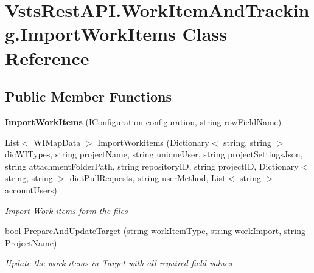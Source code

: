 \hypertarget{class_vsts_rest_a_p_i_1_1_work_item_and_tracking_1_1_import_work_items}{}\section{Vsts\+Rest\+A\+P\+I.\+Work\+Item\+And\+Tracking.\+Import\+Work\+Items Class Reference}
\label{class_vsts_rest_a_p_i_1_1_work_item_and_tracking_1_1_import_work_items}
\subsection*{Public Member Functions}
\begin{DoxyCompactItemize}
\item 
\mbox{\label{class_vsts_rest_a_p_i_1_1_work_item_and_tracking_1_1_import_work_items_a2ee1fe393b4ce2879cf0ad53feef7be2}} 
{\bfseries Import\+Work\+Items} (\mbox{\hyperlink{interface_vsts_rest_a_p_i_1_1_i_configuration}{I\+Configuration}} configuration, string row\+Field\+Name)
\item 
List$<$ \mbox{\hyperlink{class_vsts_rest_a_p_i_1_1_work_item_and_tracking_1_1_w_i_map_data}{W\+I\+Map\+Data}} $>$ \mbox{\hyperlink{class_vsts_rest_a_p_i_1_1_work_item_and_tracking_1_1_import_work_items_a314f15de4c9b09b3911af9d079abe306}{Import\+Workitems}} (Dictionary$<$ string, string $>$ dic\+W\+I\+Types, string project\+Name, string unique\+User, string project\+Settings\+Json, string attachment\+Folder\+Path, string repository\+ID, string project\+ID, Dictionary$<$ string, string $>$ dict\+Pull\+Requests, string user\+Method, List$<$ string $>$ account\+Users)
\begin{DoxyCompactList}\small\item\em Import Work items form the files \end{DoxyCompactList}\item 
bool \mbox{\hyperlink{class_vsts_rest_a_p_i_1_1_work_item_and_tracking_1_1_import_work_items_a4e9b291e9e8e0c84200d2fa06f0bc068}{Prepare\+And\+Update\+Target}} (string work\+Item\+Type, string work\+Import, string Project\+Name)
\begin{DoxyCompactList}\small\item\em Update the work items in Target with all required field values \end{DoxyCompactList}\item 

\end{DoxyCompactItemize}
